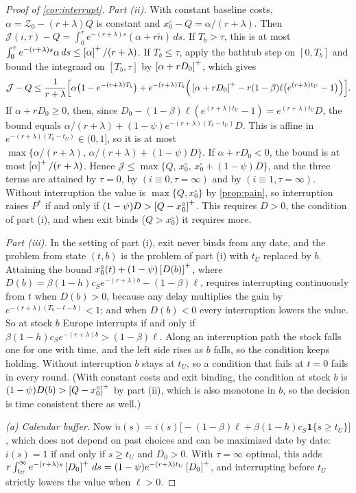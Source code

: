 \begin{proof}[Proof of \cref{cor:interrupt}]
\emph{Part (ii).} With constant baseline costs, $\alpha=\mathcal Z_0-(r+\lambda)Q$ is constant and $x^\circ_0-Q=\alpha/(r+\lambda)$. Then $\mathcal J(i,\tau)-Q=\int_0^\tau e^{-(r+\lambda)s}(\alpha+r\tilde n)\,ds$. If $T_b>\tau$, this is at most $\int_0^\tau e^{-(r+\lambda)s}\alpha\,ds\le\left[\alpha\right]^{+}/(r+\lambda)$. If $T_b\le\tau$, apply the bathtub step on $[0,T_b]$ and bound the integrand on $[T_b,\tau]$ by $\left[\alpha+rD_0\right]^{+}$, which gives
\[
\mathcal J-Q\le\frac{1}{r+\lambda}\Big[\alpha\big(1-e^{-(r+\lambda)T_b}\big)+e^{-(r+\lambda)T_b}\Big(\left[\alpha+rD_0\right]^{+}-r(1-\beta)\ell\big(e^{(r+\lambda)t_U}-1\big)\Big)\Big].
\]
If $\alpha+rD_0\ge 0$, then, since $D_0-(1-\beta)\ell(e^{(r+\lambda)t_U}-1)=e^{(r+\lambda)t_U}D$, the bound equals $\alpha/(r+\lambda)+(1-\psi)e^{-(r+\lambda)(T_b-t_U)}D$. This is affine in $e^{-(r+\lambda)(T_b-t_U)}\in(0,1]$, so it is at most $\max\{\alpha/(r+\lambda),\,\alpha/(r+\lambda)+(1-\psi)D\}$. If $\alpha+rD_0<0$, the bound is at most $\left[\alpha\right]^{+}/(r+\lambda)$. Hence $\mathcal J\le\max\{Q,\,x^\circ_0,\,x^\circ_0+(1-\psi)D\}$, and the three terms are attained by $\tau=0$, by $(i\equiv 0,\tau=\infty)$ and by $(i\equiv 1,\tau=\infty)$. Without interruption the value is $\max\{Q,x^\circ_0\}$ by \cref{prop:pain}, so interruption raises $P^*$ if and only if $(1-\psi)D>\left[Q-x^\circ_0\right]^{+}$. This requires $D>0$, the condition of part (i), and when exit binds ($Q>x^\circ_0$) it requires more.

\emph{Part (iii).} In the setting of part (i), exit never binds from any date, and the problem from state $(t,b)$ is the problem of part (i) with $t_U$ replaced by $b$. Attaining the bound $x^\circ_0(t)+(1-\psi)\left[D(b)\right]^{+}$, where $D(b)=\beta(1-h)c_Se^{-(r+\lambda)b}-(1-\beta)\ell$, requires interrupting continuously from $t$ when $D(b)>0$, because any delay multiplies the gain by $e^{-(r+\lambda)(T_b-t-b)}<1$; and when $D(b)<0$ every interruption lowers the value. So at stock $b$ Europe interrupts if and only if $\beta(1-h)c_Se^{-(r+\lambda)b}>(1-\beta)\ell$. Along an interruption path the stock falls one for one with time, and the left side rises as $b$ falls, so the condition keeps holding. Without interruption $b$ stays at $t_U$, so a condition that fails at $t=0$ fails in every round. (With constant costs and exit binding, the condition at stock $b$ is $(1-\psi)D(b)>\left[Q-x^\circ_0\right]^{+}$ by part (ii), which is also monotone in $b$, so the decision is time consistent there as well.)

\emph{(a) Calendar buffer.} Now $\tilde n(s)=i(s)\big[-(1-\beta)\ell+\beta(1-h)c_S\mathbf 1\{s\ge t_U\}\big]$, which does not depend on past choices and can be maximized date by date: $i(s)=1$ if and only if $s\ge t_U$ and $D_0>0$. With $\tau=\infty$ optimal, this adds $r\int_{t_U}^\infty e^{-(r+\lambda)s}\left[D_0\right]^{+}\,ds=(1-\psi)e^{-(r+\lambda)t_U}\left[D_0\right]^{+}$, and interrupting before $t_U$ strictly lowers the value when $\ell>0$.


\end{proof}
